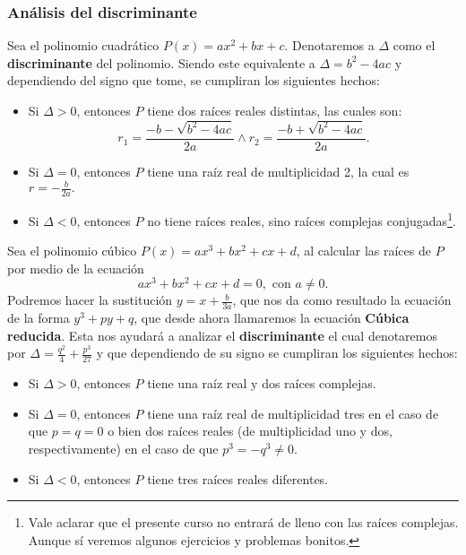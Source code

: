 {    \subsubsection{Análisis del discriminante}
    {
        Sea el polinomio cuadrático $P(x) = ax^2 + bx + c$. Denotaremos a $\Delta$ como el \textbf{discriminante} del polinomio.
        Siendo este equivalente a $\Delta = b^2 - 4ac$ y dependiendo del signo que tome, se cumpliran los siguientes hechos:
        \begin{itemize}
            \item Si $\Delta > 0$, entonces $P$ tiene dos raíces reales distintas, las cuales son:
            \[r_1 = \frac{-b - \sqrt {b^2 - 4ac}}{2a} \land r_2 = \frac{-b + \sqrt {b^2 - 4ac}}{2a}.\]
            \item Si $\Delta = 0$, entonces $P$ tiene una raíz real de multiplicidad 2, la cual es $r = -\frac{b}{2a}.$
            \item Si $\Delta < 0$, entonces $P$ no tiene raíces reales, sino raíces complejas conjugadas\footnote{Vale aclarar que el presente curso no entrará de lleno con las raíces complejas.\\Aunque sí veremos algunos ejercicios y problemas bonitos.}.
        \end{itemize}

        Sea el polinomio cúbico $P(x) = ax^3 + bx^2 + cx + d$, al calcular las raíces de $P$ por medio de la ecuación
        \[ ax^3 + bx^2 + cx + d = 0, \mbox{ con } a \neq 0. \] Podremos hacer la sustitución $y = x + \frac{b}{3a}$, que nos da como resultado
        la ecuación de la forma $y^3 + py + q$, que desde ahora llamaremos la ecuación \textbf{Cúbica reducida}.
        Esta nos ayudará a analizar el \textbf{discriminante} el cual denotaremos por $\Delta = \frac{q^2}{4} + \frac{p^3}{27}$ y que dependiendo de su signo se cumpliran los siguientes hechos:
        \begin{itemize}
            \item Si $\Delta > 0$, entonces $P$ tiene una raíz real y dos raíces complejas.
            \item Si $\Delta = 0$, entonces $P$ tiene una raíz real de multiplicidad tres en el caso de que $p = q = 0$ o bien dos raíces reales (de multiplicidad uno y dos, respectivamente) en el caso de que $p^3 = -q^3 \neq 0.$
            \item Si $\Delta < 0$, entonces $P$ tiene tres raíces reales diferentes.
        \end{itemize}
    }

}
